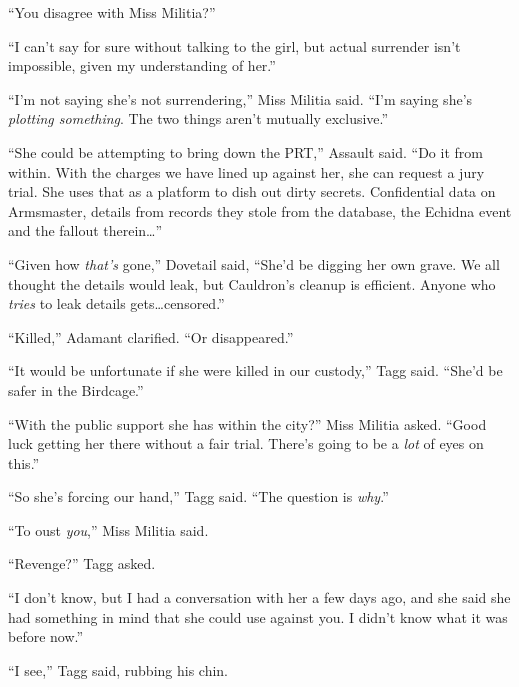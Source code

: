 ``You disagree with Miss Militia?''



``I can't say for sure without talking to the girl, but actual surrender isn't impossible, given my understanding of her.''



``I'm not saying she's not surrendering,'' Miss Militia said.  ``I'm saying she's \emph{plotting something}.  The two things aren't mutually exclusive.''



``She could be attempting to bring down the PRT,'' Assault said.  ``Do it from within.  With the charges we have lined up against her, she can request a jury trial.  She uses that as a platform to dish out dirty secrets.  Confidential data on Armsmaster, details from records they stole from the database, the Echidna event and the fallout therein\ldots''



``Given how \emph{that's }gone,'' Dovetail said, ``She'd be digging her own grave.  We all thought the details would leak, but Cauldron's cleanup is efficient.  Anyone who \emph{tries} to leak details gets\ldots censored.''



``Killed,'' Adamant clarified.  ``Or disappeared.''



``It would be unfortunate if she were killed in our custody,'' Tagg said.  ``She'd be safer in the Birdcage.''



``With the public support she has within the city?'' Miss Militia asked.  ``Good luck getting her there without a fair trial.  There's going to be a \emph{lot} of eyes on this.''



``So she's forcing our hand,'' Tagg said.  ``The question is \emph{why}.''



``To oust \emph{you},'' Miss Militia said.



``Revenge?'' Tagg asked.



``I don't know, but I had a conversation with her a few days ago, and she said she had something in mind that she could use against you.  I didn't know what it was before now.''



``I see,'' Tagg said, rubbing his chin.



